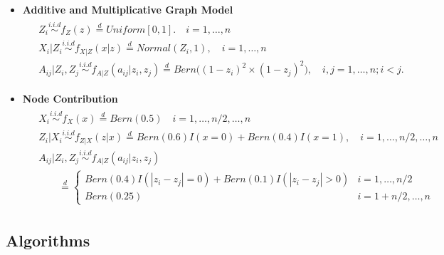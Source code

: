 \documentclass[12pt]{article}
\theoremstyle{definition}
\begin{document}
\begin{itemize}
\item \textbf{Additive and Multiplicative Graph Model}
\begin{equation}
	\label{eq:ame}
	\begin{gathered}
	\begin{aligned}
	&	Z_{i} \overset{i.i.d}{\sim} f_{Z}(z) \stackrel{d}{=} Uniform[0,1]. \quad i = 1, \ldots, n \\ 
	&	X_{i} | Z_{i} \overset{i.i.d}{\sim}  f_{X|Z}(x|z) \stackrel{d}{=}  Normal(Z_{i}, 1), \quad i= 1, \ldots, n \\
	&	A_{ij} | Z_{i}, Z_{j} \overset{i.i.d}{\sim}  f_{A|Z}(a_{ij} | z_{i}, z_{j}) \stackrel{d}{=}   Bern \big(  ( 1 - z_{i})^2 \times (1 - z_{j})^2    \big), \quad i,j = 1, \ldots, n; i < j.
	\end{aligned}
	\end{gathered}
\end{equation}	

\item \textbf{Node Contribution}
\begin{equation}
\begin{gathered}
\begin{aligned}
& X_{i} \overset{i.i.d}{\sim} f_{X}(x)   \stackrel{d}{=}  Bern(0.5)  \quad i = 1, \ldots ,n/2, \ldots, n \\ & Z_{i} | X_{i}  \overset{i.i.d}{\sim}    f_{Z|X}(z|x)  \stackrel{d}{=}   Bern(0.6) I(x = 0) + Bern(0.4) I(x=1), \quad  i = 1,\ldots,n/2, \ldots, n \\
& A_{ij} | Z_{i}, Z_{j}   \overset{i.i.d}{\sim}   f_{A|Z}(a_{ij} | z_{i}, z_{j})  \\ & \quad  \quad \stackrel{d}{=} \left\{  \begin{array}{cc} Bern(0.4) I(|z_{i} - z_{j}| = 0)  + Bern(0.1) I(|z_{i} - z_{j}| > 0) & i = 1,\ldots,n/2 \\   Bern(0.25)  & i=1+n/2, \ldots, n  \end{array} \right.
\end{aligned}
\end{gathered}
\label{eq:contri}
\end{equation}

\end{itemize}


\subsection{Algorithms}
\end{document}
